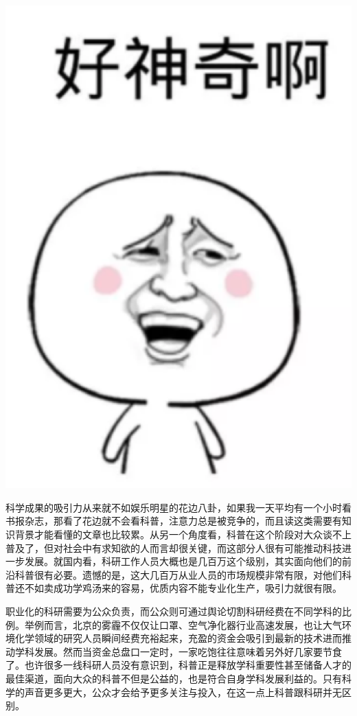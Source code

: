 \documentclass[
]{book}
\begin{document}
\includegraphics[width=5.97in]{images/pops5}

科学成果的吸引力从来就不如娱乐明星的花边八卦，如果我一天平均有一个小时看书报杂志，那看了花边就不会看科普，注意力总是被竞争的，而且读这类需要有知识背景才能看懂的文章也比较累。从另一个角度看，科普在这个阶段对大众谈不上普及了，但对社会中有求知欲的人而言却很关键，而这部分人很有可能推动科技进一步发展。就国内看，科研工作人员大概也是几百万这个级别，其实面向他们的前沿科普很有必要。遗憾的是，这大几百万从业人员的市场规模非常有限，对他们科普还不如卖成功学鸡汤来的容易，优质内容不能专业化生产，吸引力就很有限。

职业化的科研需要为公众负责，而公众则可通过舆论切割科研经费在不同学科的比例。举例而言，北京的雾霾不仅仅让口罩、空气净化器行业高速发展，也让大气环境化学领域的研究人员瞬间经费充裕起来，充盈的资金会吸引到最新的技术进而推动学科发展。然而当资金总盘口一定时，一家吃饱往往意味着另外好几家要节食了。也许很多一线科研人员没有意识到，科普正是释放学科重要性甚至储备人才的最佳渠道，面向大众的科普不但是公益的，也是符合自身学科发展利益的。只有科学的声音更多更大，公众才会给予更多关注与投入，在这一点上科普跟科研并无区别。
\end{document}
